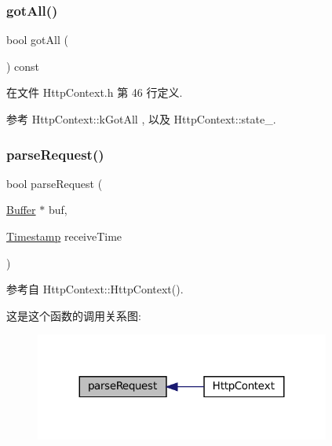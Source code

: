 \subsubsection{\texorpdfstring{got\+All()}{gotAll()}}
{\footnotesize\ttfamily bool got\+All (\begin{DoxyParamCaption}{ }\end{DoxyParamCaption}) const\hspace{0.3cm}{\ttfamily [inline]}}



在文件 Http\+Context.\+h 第 46 行定义.



参考 Http\+Context\+::k\+Got\+All , 以及 Http\+Context\+::state\+\_\+.

\mbox{\label{classmuduo_1_1net_1_1HttpContext_a0cba53638467f64e0018aaf96dd35f61}} 
\subsubsection{\texorpdfstring{parse\+Request()}{parseRequest()}}
{\footnotesize\ttfamily bool parse\+Request (\begin{DoxyParamCaption}\item[{\hyperlink{classmuduo_1_1net_1_1Buffer}{Buffer} $\ast$}]{buf,  }\item[{\hyperlink{classmuduo_1_1Timestamp}{Timestamp}}]{receive\+Time }\end{DoxyParamCaption})}



参考自 Http\+Context\+::\+Http\+Context().

这是这个函数的调用关系图\+:
\nopagebreak
\begin{figure}[H]
\begin{center}
\leavevmode
\includegraphics[width=275pt]{classmuduo_1_1net_1_1HttpContext_a0cba53638467f64e0018aaf96dd35f61_icgraph}
\end{center}
\end{figure}
\mbox{\label{classmuduo_1_1net_1_1HttpContext_a821b8727fba9b866e5d04d766a82e715}} 
